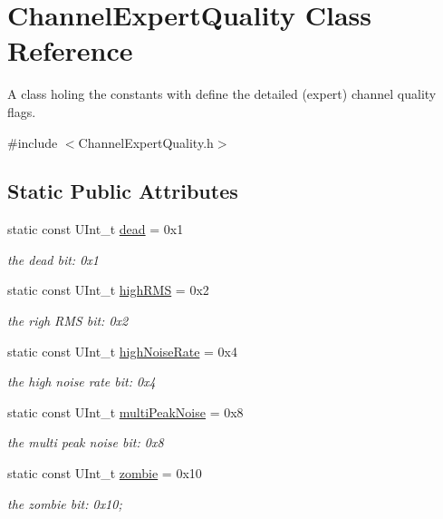 \hypertarget{class_channel_expert_quality}{\section{Channel\-Expert\-Quality Class Reference}
\label{class_channel_expert_quality}
}


A class holing the constants with define the detailed (expert) channel quality flags.  




{\ttfamily \#include $<$Channel\-Expert\-Quality.\-h$>$}

\subsection*{Static Public Attributes}
\begin{DoxyCompactItemize}
\item 
static const U\-Int\-\_\-t \hyperlink{class_channel_expert_quality_aabde82530d3975d698fbff3e33d7972c}{dead} = 0x1
\begin{DoxyCompactList}\small\item\em the dead bit\-: 0x1 \end{DoxyCompactList}\item 
static const U\-Int\-\_\-t \hyperlink{class_channel_expert_quality_a0b17164b19cdc8619c1a93fe1728c4c3}{high\-R\-M\-S} = 0x2
\begin{DoxyCompactList}\small\item\em the righ R\-M\-S bit\-: 0x2 \end{DoxyCompactList}\item 
static const U\-Int\-\_\-t \hyperlink{class_channel_expert_quality_a7ec5758ee03b6f11af837adad6b4a676}{high\-Noise\-Rate} = 0x4
\begin{DoxyCompactList}\small\item\em the high noise rate bit\-: 0x4 \end{DoxyCompactList}\item 
static const U\-Int\-\_\-t \hyperlink{class_channel_expert_quality_a13046f6e61373f907a79326530ee2e07}{multi\-Peak\-Noise} = 0x8
\begin{DoxyCompactList}\small\item\em the multi peak noise bit\-: 0x8 \end{DoxyCompactList}\item 
static const U\-Int\-\_\-t \hyperlink{class_channel_expert_quality_a260970cb0e2fe88bfc6cf741ca95b104}{zombie} = 0x10
\begin{DoxyCompactList}\small\item\em the zombie bit\-: 0x10; \end{DoxyCompactList}\end{DoxyCompactItemize}


